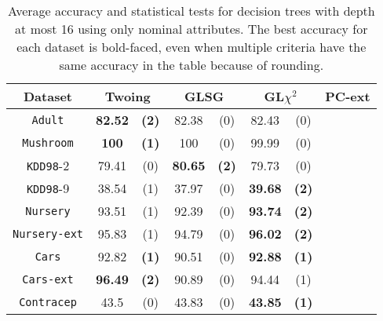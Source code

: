 \begin{table}
\small
\caption{Average accuracy and statistical tests  for  decision trees 
with depth at most 16 using only nominal attributes. The best accuracy for each dataset is bold-faced, even when multiple criteria have the same accuracy in the table because of rounding.}
\centering
\begin{tabular}{c|cc|cc|cc|cc} 
Dataset             & \multicolumn{2}{c|}{Twoing} &  \multicolumn{2}{c|}{GLSG}  & \multicolumn{2}{c|}{GL$\chi^2$} & \multicolumn{2}{c}{PC-ext}\\ \hline
{\tt Adult}         &  {\bf 82.52} & {\bf (2)}    &  82.38       &  (0)         &  82.43       & (0)              &            &              \\
{\tt Mushroom}      &  {\bf 100}   & {\bf (1)}    &  100         &  (0)         &  99.99       & (0)              &            &              \\
{\tt KDD98}-2       &  79.41       & (0)          &  {\bf 80.65} & {\bf (2)}    &  79.73       & (0)              &            &              \\
{\tt KDD98}-9       &  38.54       & (1)          &  37.97       & (0)          &  {\bf 39.68} & {\bf (2)}        &            &              \\
{\tt Nursery}       &  93.51       & (1)          &  92.39       & (0)          &  {\bf 93.74} & {\bf (2)}        &            &              \\
{\tt Nursery-ext}   &  95.83       & (1)          &  94.79       & (0)          &  {\bf 96.02} & {\bf (2)}        &            &              \\
{\tt Cars}          &  92.82       & {\bf (1)}    &  90.51       & (0)          &  {\bf 92.88} & {\bf (1)}        &            &              \\
{\tt Cars-ext}      &  {\bf 96.49} & {\bf (2)}    &  90.89       & (0)          &  94.44       & (1)              &            &              \\
{\tt Contracep}     &  43.5        & (0)          &  43.83       & (0)          &  {\bf 43.85} & {\bf (1)}        &            &              \\

\end{tabular}
\end{table}
